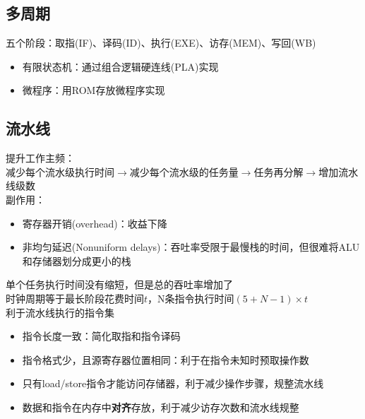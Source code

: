 \subsection{多周期}
五个阶段：取指(IF)、译码(ID)、执行(EXE)、访存(MEM)、写回(WB)
\begin{itemize}
	\item 有限状态机：通过组合逻辑硬连线(PLA)实现
	\item 微程序：用ROM存放微程序实现
\end{itemize}

\subsection{流水线}
提升工作主频：\\
减少每个流水级执行时间$\to$减少每个流水级的任务量$\to$任务再分解$\to$增加流水线级数\\
副作用：
\begin{itemize}
	\item 寄存器开销(overhead)：收益下降
	\item 非均匀延迟(Nonuniform delays)：吞吐率受限于最慢栈的时间，但很难将ALU和存储器划分成更小的栈
\end{itemize}
单个任务执行时间没有缩短，但是总的吞吐率增加了\\
时钟周期等于最长阶段花费时间$t$，N条指令执行时间$(5+N-1)\times t$\\
利于流水线执行的指令集
\begin{itemize}
	\item 指令长度一致：简化取指和指令译码
	\item 指令格式少，且源寄存器位置相同：利于在指令未知时预取操作数
	\item 只有load/store指令才能访问存储器，利于减少操作步骤，规整流水线
	\item 数据和指令在内存中\textbf{对齐}存放，利于减少访存次数和流水线规整
\end{itemize}


